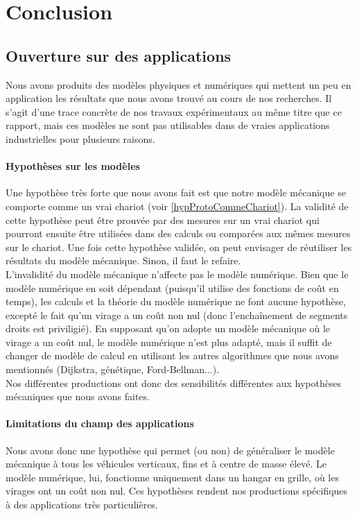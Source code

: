 \section{Conclusion}

\subsection{Ouverture sur des applications}
Nous avons produits des modèles physiques et numériques qui mettent un peu en application les résultats que nous avons trouvé au cours de nos recherches. Il s'agit d'une trace concrète de nos travaux expérimentaux au même titre que ce rapport, mais ces modèles ne sont pas utilisables dans de vraies applications industrielles pour plusieurs raisons.
\paragraph{Hypothèses sur les modèles} Une hypothèse très forte que nous avons fait est que notre modèle mécanique se comporte comme un vrai chariot (voir \ref{hypProtoCommeChariot}). La validité de cette hypothèse peut être prouvée par des mesures sur un vrai chariot qui pourront ensuite être utilisées dans des calculs ou comparées aux mêmes mesures sur le chariot. Une fois cette hypothèse validée, on peut envisager de réutiliser les résultats du modèle mécanique. Sinon, il faut le refaire.\\
L'invalidité du modèle mécanique n'affecte pas le modèle numérique. Bien que le modèle numérique en soit dépendant (puisqu'il utilise des fonctions de coût en temps), les calculs et la théorie du modèle numérique ne font aucune hypothèse, excepté le fait qu'un virage a un coût non nul (donc l'enchaînement de segments droits est priviligié). En supposant qu'on adopte un modèle mécanique où le virage a un coût nul, le modèle numérique n'est plus adapté, mais il suffit de changer de modèle de calcul en utilisant les autres algorithmes que nous avons mentionnés (Dijkstra, génétique, Ford-Bellman...).\\
Nos différentes productions ont donc des sensibilités différentes aux hypothèses mécaniques que nous avons faites.
\paragraph{Limitations du champ des applications}Nous avons donc une hypothèse qui permet (ou non) de généraliser le modèle mécanique à tous les véhicules verticaux, fins et à centre de masse élevé. Le modèle numérique, lui, fonctionne uniquement dans un hangar en grille, où les virages ont un coût non nul. Ces hypothèses rendent nos productions spécifiques à des applications très particulières.
